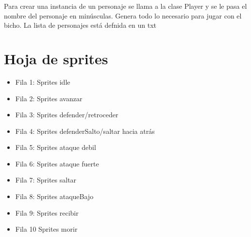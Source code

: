 \documentclass[10pt,a4paper,titlepage]{article}
\begin{document}
Para crear una instancia de un personaje se llama a la clase Player y se le pasa el nombre del personaje en minúsculas. Genera todo lo necesario para jugar con el bicho.
La lista de personajes está defnida en un txt

\section{Hoja de sprites}
\begin{itemize}
	\item {Fila 1:} Sprites idle
	\item {Fila 2:} Sprites avanzar
	\item {Fila 3:} Sprites defender/retroceder
	\item {Fila 4:} Sprites defenderSalto/saltar hacia atrás
	\item {Fila 5:} Sprites ataque debil
	\item {Fila 6:} Sprites ataque fuerte
	\item {Fila 7:} Sprites saltar
	\item {Fila 8:} Sprites ataqueBajo
	\item {Fila 9:} Sprites recibir
	\item {Fila 10} Sprites morir
\end{itemize}
\end{document}
